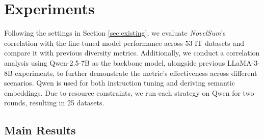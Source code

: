 \section{Experiments}
\label{sec:exp}
Following the settings in Section \ref{sec:existing}, we evaluate \textit{NovelSum}'s correlation with the fine-tuned model performance across 53 IT datasets and compare it with previous diversity metrics. Additionally, we conduct a correlation analysis using Qwen-2.5-7B \cite{yang2024qwen2} as the backbone model, alongside previous LLaMA-3-8B experiments, to further demonstrate the metric's effectiveness across different scenarios. Qwen is used for both instruction tuning and deriving semantic embeddings. Due to resource constraints, we run each strategy on Qwen for two rounds, resulting in 25 datasets. 

\subsection{Main Results}

